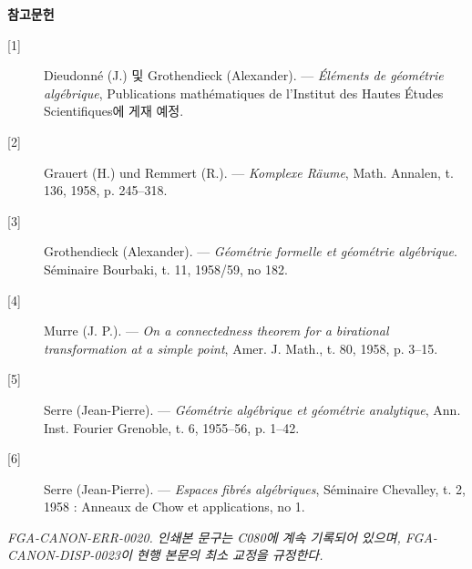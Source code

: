 \begin{center}
  \textbf{참고문헌}
\end{center}

\begin{description}
  \item[{[1]}] Dieudonn\'e (J.) 및 Grothendieck (Alexander). --- \emph{Éléments
    de géométrie algébrique}, Publications mathématiques de l'Institut des
    Hautes Études Scientifiques에 게재 예정.
  \item[{[2]}] Grauert (H.) und Remmert (R.). --- \emph{Komplexe Räume}, Math.
    Annalen, t. 136, 1958, p. 245--318.
  \item[{[3]}] Grothendieck (Alexander). --- \emph{Géométrie formelle et
    géométrie algébrique}. Séminaire Bourbaki, t. 11, 1958/59, no 182.
  \item[{[4]}] Murre (J. P.). --- \emph{On a connectedness theorem for a
    birational transformation at a simple point}, Amer. J. Math., t. 80, 1958,
    p. 3--15.
  \item[{[5]}] Serre (Jean-Pierre). --- \emph{Géométrie algébrique et géométrie
    analytique}, Ann. Inst. Fourier Grenoble, t. 6, 1955--56, p. 1--42.
  \item[{[6]}] Serre (Jean-Pierre). --- \emph{Espaces fibrés algébriques},
    Séminaire Chevalley, t. 2, 1958 : Anneaux de Chow et applications, no 1.
\end{description}

\par\smallskip
\begingroup\footnotesize
\noindent\textit{FGA-CANON-ERR-0020. 인쇄본 문구는 C080에 계속 기록되어 있으며, FGA-CANON-DISP-0023이 현행 본문의 최소 교정을 규정한다.}\par
\endgroup
